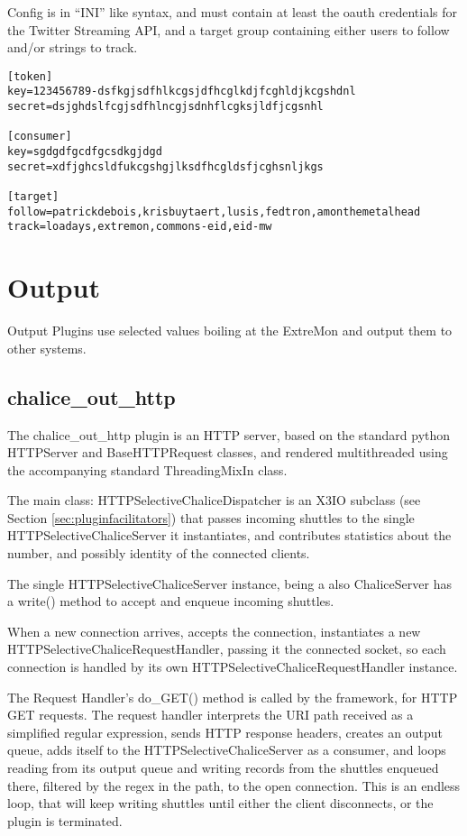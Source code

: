 Config is in ``INI'' like syntax, and must contain at least the oauth
credentials for the Twitter Streaming API, and a target group containing
either users to follow and\slash{}or strings to track.

\begin{verbatim}
[token]
key=123456789-dsfkgjsdfhlkcgsjdfhcglkdjfcghldjkcgshdnl
secret=dsjghdslfcgjsdfhlncgjsdnhflcgksjldfjcgsnhl

[consumer]
key=sgdgdfgcdfgcsdkgjdgd
secret=xdfjghcsldfukcgshgjlksdfhcgldsfjcghsnljkgs

[target]
follow=patrickdebois,krisbuytaert,lusis,fedtron,amonthemetalhead
track=loadays,extremon,commons-eid,eid-mw
\end{verbatim}

\section{Output \witches{}}

Output Plugins use selected values boiling at the ExtreMon \cauldron{} and
output them to other systems.

\subsection{chalice\_out\_http}

The chalice\_out\_http plugin is an HTTP server, based on the standard
python HTTPServer and BaseHTTPRequest classes, and rendered multithreaded
using the accompanying standard ThreadingMixIn class.

The main class: HTTPSelectiveChaliceDispatcher is an X3IO subclass (see
Section \ref{sec:pluginfacilitators}) that passes incoming shuttles to
the single HTTPSelectiveChaliceServer it instantiates, and contributes
statistics about the number, and possibly identity of the connected
clients.

The single HTTPSelectiveChaliceServer instance, being a also ChaliceServer
has a write() method to accept and enqueue incoming shuttles.

When a new connection arrives, accepts the connection, instantiates a new
HTTPSelectiveChaliceRequestHandler, passing it the connected socket, so
each connection is handled by its own HTTPSelectiveChaliceRequestHandler
instance.

The Request Handler's do\_GET() method is called by the framework, for
HTTP GET requests. The request handler interprets the URI path received
as a simplified regular expression, sends HTTP response headers, creates
an output queue, adds itself to the HTTPSelectiveChaliceServer as a
consumer, and loops reading from its output queue and writing records
from the shuttles enqueued there, filtered by the regex in the path,
to the open connection. This is an endless loop, that will keep writing
shuttles until either the client disconnects, or the plugin is terminated.

